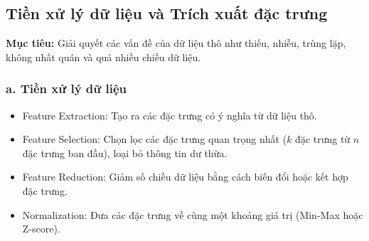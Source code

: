 \subsection{Tiền xử lý dữ liệu và Trích xuất đặc trưng}
\textbf{Mục tiêu:} Giải quyết các vấn đề của dữ liệu thô như thiếu, nhiễu, trùng lặp, không nhất quán và quá nhiều chiều dữ liệu.

\subsubsection*{a. Tiền xử lý dữ liệu}
\begin{itemize}
    \item Feature Extraction: Tạo ra các đặc trưng có ý nghĩa từ dữ liệu thô.
    \item Feature Selection: Chọn lọc các đặc trưng quan trọng nhất ($k$ đặc trưng từ $n$ đặc trưng ban đầu), loại bỏ thông tin dư thừa.
    \item Feature Reduction: Giảm số chiều dữ liệu bằng cách biến đổi hoặc kết hợp đặc trưng.
    \item Normalization: Đưa các đặc trưng về cùng một khoảng giá trị (Min-Max hoặc Z-score).
\end{itemize}

